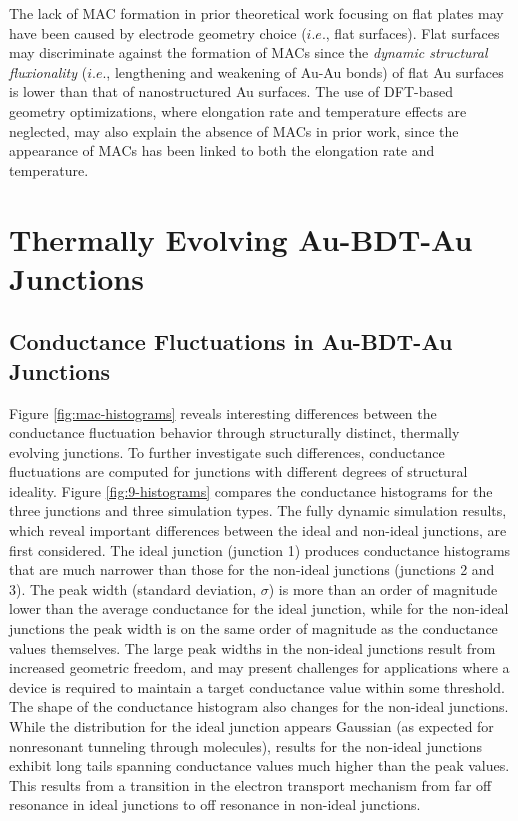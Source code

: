 \documentclass[10pt]{report}  %
\newcommand\findent{\hspace*{\parindent}}
\begin{document}
The lack of MAC formation in prior theoretical work focusing on flat plates  \cite{Sergueev:2010,Pontes:2011,Strange:2010,Romaner:2006} may have been caused by electrode geometry choice ($i.e.$, flat surfaces).  Flat surfaces may discriminate against the formation of MACs since the \textit{dynamic structural fluxionality} ($i.e.$, lengthening and weakening of Au-Au bonds) of flat Au surfaces is lower than that of nanostructured Au surfaces.\cite{Rashkeev:2007} The use of DFT-based geometry optimizations,\cite{Sergueev:2010,Pontes:2011} where elongation rate and temperature effects are neglected, may also explain the absence of MACs in prior work, since the appearance of MACs has been linked to both the elongation rate and temperature.\cite{Pu:2008}  


\section{Thermally Evolving Au-BDT-Au Junctions}

\subsection{Conductance Fluctuations in Au-BDT-Au Junctions}

\findent Figure \ref{fig:mac-histograms} reveals interesting differences between the conductance fluctuation behavior through structurally distinct, thermally evolving junctions. To further investigate such differences, conductance fluctuations are computed for junctions with different degrees of structural ideality. Figure \ref{fig:9-histograms} compares the conductance histograms for the three junctions and three simulation types. The fully dynamic simulation results, which reveal important differences between the ideal and non-ideal junctions, are first considered. The ideal junction (junction 1) produces conductance histograms that are much narrower than those for the non-ideal junctions (junctions 2 and 3). The peak width (standard deviation, $\sigma$) is more than an order of magnitude lower than the average conductance for the ideal junction, while for the non-ideal junctions the peak width is on the same order of magnitude as the conductance values themselves. The large peak widths in the non-ideal junctions result from increased geometric freedom, and may present challenges for applications where a device is required to maintain a target conductance value within some threshold. The shape of the conductance histogram also changes for the non-ideal junctions. While the distribution for the ideal junction appears Gaussian (as expected for nonresonant tunneling through molecules\cite{Reuter:2012}), results for the non-ideal junctions exhibit long tails spanning conductance values much higher than the peak values. This results from a transition in the electron transport mechanism from far off resonance in ideal junctions to off resonance in non-ideal junctions.
\end{document}

